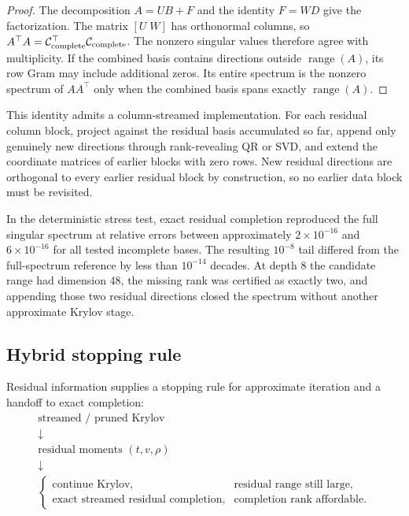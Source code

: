 \begin{proof}
The decomposition $A=UB+F$ and the identity $F=WD$ give the factorization.
The matrix $[U\;W]$ has orthonormal columns, so
$A^\top A=\mathcal C_{\rm complete}^\top\mathcal C_{\rm complete}$.
The nonzero singular values therefore agree with multiplicity. If the
combined basis contains directions outside $\operatorname{range}(A)$,
its row Gram may include additional zeros. Its entire spectrum is the
nonzero spectrum of $AA^\top$ only when the combined basis spans exactly
$\operatorname{range}(A)$.
\end{proof}

This identity admits a column-streamed implementation.  For each residual
column block, project against the residual basis accumulated so far, append
only genuinely new directions through rank-revealing QR or SVD, and extend the
coordinate matrices of earlier blocks with zero rows.  New residual directions
are orthogonal to every earlier residual block by construction, so no earlier
data block must be revisited.

In the deterministic stress test, exact residual completion reproduced the
full singular spectrum at relative errors between approximately
\(2\times10^{-16}\) and \(6\times10^{-16}\) for all tested incomplete bases.
The resulting \(10^{-8}\) tail differed from the full-spectrum reference by
less than \(10^{-14}\) decades.  At depth 8 the candidate range had dimension
48, the missing rank was certified as exactly two, and appending those two
residual directions closed the spectrum without another approximate Krylov
stage.

\subsection{Hybrid stopping rule}

Residual information supplies a stopping rule for approximate iteration and
a handoff to exact completion:
\[
\boxed{
\begin{array}{c}
\text{streamed / pruned Krylov}\\[2mm]
\downarrow\\[-1mm]
\text{residual moments }(t,v,\rho)\\[2mm]
\downarrow\\[-1mm]
\begin{cases}
\text{continue Krylov}, & \text{residual range still large},\\
\text{exact streamed residual completion}, & \text{completion rank affordable}.
\end{cases}
\end{array}
}
\]

